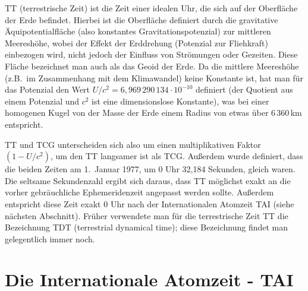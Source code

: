TT (terrestrische Zeit) 
ist die Zeit einer idealen Uhr, die sich auf der Oberfl\"ache der Erde befindet. Hierbei ist die Oberfl\"ache
definiert durch die gravitative \"Aquipotentialfl\"ache (also konstantes Gravitationspotenzial) zur mittleren 
Meeresh\"ohe, wobei der Effekt der Erddrehung (Potenzial zur Fliehkraft) 
einbezogen wird, nicht jedoch der Einfluss von Str\"omungen oder Gezeiten. Diese Fl\"ache bezeichnet man
auch als das Geoid der Erde. Da die mittlere Meeresh\"ohe
(z.B.\ im Zusammenhang mit dem Klimawandel) keine Konstante ist, hat man f\"ur das Potenzial
den Wert $U/c^2=6,969\,290\,134\cdot 10^{-10}$ definiert (der Quotient aus einem Potenzial
und $c^2$ ist eine dimensionslose Konstante), was bei einer homogenen Kugel von der Masse der Erde
einem Radius von etwas \"uber 6\,360\,km entspricht. 

TT und TCG unterscheiden sich also um einen multiplikativen Faktor $( 1 - U/c^2)$, um den TT langsamer
ist als TCG. Au\ss erdem wurde definiert, dass die beiden Zeiten am 1.\ Januar 1977, um 0 Uhr 32,184 Sekunden,
gleich waren. Die seltsame Sekundenzahl ergibt sich daraus, dass TT m\"oglichst exakt an die vorher
gebr\"auchliche Ephemeridenzeit angepasst werden sollte. Au\ss erdem entspricht diese Zeit exakt 0 Uhr nach 
der Internationalen Atomzeit TAI (siehe n\"achsten Abschnitt). Fr\"uher verwendete man f\"ur die terrestrische
Zeit TT die Bezeichnung TDT 
(terrestrial dynamical time); diese Bezeichnung findet man gelegentlich immer noch.  

\section{Die Internationale Atomzeit - TAI}

